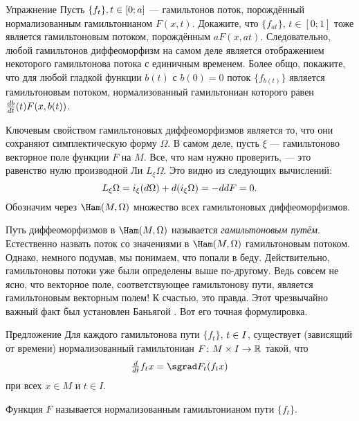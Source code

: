 \begin{ex}{Упражнение}\label{1.4.A}
Пусть $\{f_t\}, t \z\in [0; a]$ — гамильтонов поток, порождённый нормализованным гамильтонианом $ F (x, t)$.
Докажите, что $\{f_{at}\}$, $t \in [0; 1]$ тоже является гамильтоновым потоком, порождённым $aF (x, at)$.
Следовательно, любой гамильтонов диффеоморфизм на самом деле является отображением некоторого гамильтонова потока с единичным временем.
Более общо, покажите, что для любой гладкой функции $b (t)$ с $b (0) =
0$ поток $\{f_{b (t)}\}$ является гамильтоновым потоком, нормализованный
гамильтониан которого равен $\tfrac{d b}{d t} (t) F (x, b (t))$.
\end{ex}

Ключевым свойством гамильтоновых диффеоморфизмов является то, что они сохраняют симплектическую форму $\Omega$.
В самом деле, пусть $\xi$ — гамильтоново векторное поле функции $F$ на $M$.
Все, что нам нужно проверить, — это равенство нулю производной Ли $L_\xi \Omega$.
Это видно из следующих вычислений: 
\[L_\xi \Omega = i_\xi (d\Omega) + d (i_\xi \Omega) = -dd F = 0.\]
Обозначим через $\Ham (M, \Omega)$ множество всех гамильтоновых диффеоморфизмов.

Путь диффеоморфизмов в $\Ham (M, \Omega)$ называется \emph{гамильтоновым путём}.
Естественно назвать поток со значениями в $\Ham (M, \Omega)$ гамильтоновым потоком.
Однако, немного подумав, мы понимаем, что попали в беду.
Действительно, гамильтоновы потоки уже были определены выше по-другому.
Ведь совсем не ясно, что векторное поле, соответствующее гамильтонову пути, является гамильтоновым векторным полем!
К счастью, это правда.
Этот чрезвычайно важный факт был установлен Баньягой \cite{B1}.
Вот его точная формулировка.

\begin{thm}{Предложение}\label{1.4.B}
Для каждого гамильтонова пути $\{f_t\}$, $t \z\in I$, существует (зависящий от времени) нормализованный гамильтониан $F\colon M \times I \to \mathbb{R}$ такой, что 
\[\tfrac \d{\d t} f_t x = \sgrad F_t (f_t x)\]
при всех $x \in M$ и $t \in I$.
\end{thm}

Функция $F$ называется нормализованным гамильтонианом
пути $\{f_t\}$.

